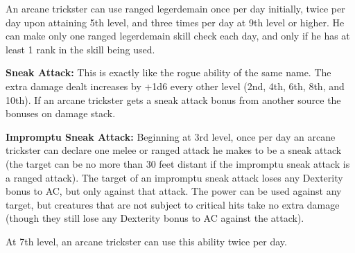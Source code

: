An arcane trickster can use ranged legerdemain once per day initially, twice per 
day upon attaining 5th level, and three times per day at 9th level or higher. He 
can make only one ranged legerdemain skill check each day, and only if he has at 
least 1 rank in the skill being used.

\textbf{Sneak Attack:} This is exactly like the rogue ability of the same name. 
The extra damage dealt increases by +1d6 every other level (2nd, 4th, 6th, 8th, 
and 10th). If an arcane trickster gets a sneak attack bonus from another source 
the bonuses on damage stack.

\textbf{Impromptu Sneak Attack:} Beginning at 3rd level, once per day an arcane 
trickster can declare one melee or ranged attack he makes to be a sneak attack 
(the target can be no more than 30 feet distant if the impromptu sneak attack is 
a ranged attack). The target of an impromptu sneak attack loses any Dexterity bonus 
to AC, but only against that attack. The power can be used against any target, 
but creatures that are not subject to critical hits take no extra damage (though 
they still lose any Dexterity bonus to AC against the attack).

At 7th level, an arcane trickster can use this ability twice per day.
